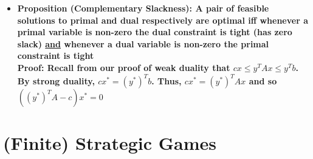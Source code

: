 \documentclass[20pt,a4paper,landscape]{extarticle}
\begin{document}
\begin{flushleft}
\begin{itemize}
\clearpage
\item \textbf{Proposition (Complementary Slackness): A pair of feasible solutions to primal and dual respectively are optimal iff whenever a primal variable is non-zero the dual constraint is tight (has zero slack) \underline{and} whenever a dual variable is non-zero the primal constraint is tight}\\
\textbf{Proof: Recall from our proof of weak duality that \boldmath$cx \leq y^TAx \leq y^Tb$. By strong duality, $cx^\ast = \left(y^\ast\right)^Tb$. Thus, $cx^\ast = \left(y^\ast\right)^TAx$ and so $\left(\left(y^\ast\right)^TA - c\right)x^\ast = 0$}
\end{itemize}
\clearpage
\section{(Finite) Strategic Games}

\end{flushleft}
\end{document}
